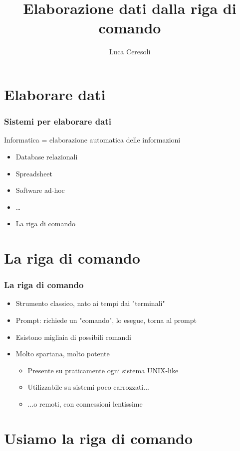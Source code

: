 \documentclass[xetex,table]{beamer}
\title{Elaborazione dati dalla riga di comando}
\author{Luca Ceresoli}
\date{}
\begin{document}
\maketitle

\section{Elaborare dati}

\begin{frame}
  \frametitle{Sistemi per elaborare dati}
  Informatica = elaborazione automatica delle informazioni
  \begin{itemize}
  \item Database relazionali
  \item Spreadsheet
  \item Software ad-hoc
  \item \dots
  \item La riga di comando
  \end{itemize}
\end{frame}

\section{La riga di comando}

\begin{frame}
  \frametitle{La riga di comando}
  \begin{itemize}
  \item Strumento classico, nato ai tempi dai "terminali"
  \item Prompt: richiede un "comando", lo esegue, torna al prompt
  \item Esistono migliaia di possibili comandi
  \item Molto spartana, molto potente
    \begin{itemize}
    \item Presente su praticamente ogni sistema UNIX-like
    \item Utilizzabile su sistemi poco carrozzati...
    \item ...o remoti, con connessioni lentissime
    \end{itemize}
  \end{itemize}
\end{frame}

\section{Usiamo la riga di comando}
\end{document}
